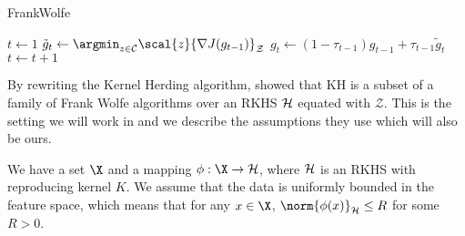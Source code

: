 \begin{algorithm}
  \caption{FrankWolfe}\label{alg:frank-wolfe}
  \begin{algorithmic}[1]
     \State $t \gets 1$  \State $\tilde{g}_{t} \gets
    \argmin_{z \in \mathcal{C}} \scal{z}{\nabla J(g_{t-1})}_{\mathcal{Z}}$ \State $g_{t}
    \gets (1 - \tau_{t-1})g_{t-1} + \tau_{t-1}\tilde{g}_t$ \State $t \gets t + 1$
    \EndWhile
    \EndProcedure
  \end{algorithmic}
\end{algorithm}

By rewriting the Kernel Herding algorithm,
\cite{bach12_equiv_between_herdin_condit_gradien_algor} showed that KH is a
subset of a family of Frank Wolfe algorithms over an RKHS \(\mathcal{H}\) equated
with \(\mathcal{Z}\). This is the setting we will work in and we describe the
assumptions they use which will also be ours.

\begin{assumption}
\label{as:fw-kernel-herding} We have a set \(\X\) and a mapping \(\phi: \X \to
\rkhs{H}\), where \(\mathcal{H}\) is an RKHS with reproducing kernel \(K\). We
assume that the data is uniformly bounded in the feature space, which means that
for any \(x \in \X\), \(\norm{\phi(x)}_{\rkhs{H}} \leq R\) for some \(R > 0\).
\end{assumption}

